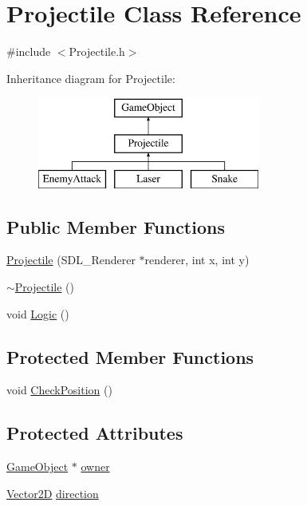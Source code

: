 \hypertarget{class_projectile}{}\section{Projectile Class Reference}
\label{class_projectile}


{\ttfamily \#include $<$Projectile.\+h$>$}

Inheritance diagram for Projectile\+:\begin{figure}[H]
\begin{center}
\leavevmode
\includegraphics[height=3.000000cm]{class_projectile}
\end{center}
\end{figure}
\subsection*{Public Member Functions}
\begin{DoxyCompactItemize}
\item 
\mbox{\hyperlink{class_projectile_a0906140caebe54c0b087c7e6240f3084}{Projectile}} (S\+D\+L\+\_\+\+Renderer $\ast$renderer, int x, int y)
\item 
\mbox{\hyperlink{class_projectile_a94903e021fa2edab60ba3836ca0b937d}{$\sim$\+Projectile}} ()
\item 
void \mbox{\hyperlink{class_projectile_a871e265207d2bf2d5180152a7acf2d40}{Logic}} ()
\end{DoxyCompactItemize}
\subsection*{Protected Member Functions}
\begin{DoxyCompactItemize}
\item 
void \mbox{\hyperlink{class_projectile_a6baf0fc9681b7c13b64a1c82671e296f}{Check\+Position}} ()
\end{DoxyCompactItemize}
\subsection*{Protected Attributes}
\begin{DoxyCompactItemize}
\item 
\mbox{\hyperlink{class_game_object}{Game\+Object}} $\ast$ \mbox{\hyperlink{class_projectile_a1a76b3677c7be9a072e7097c34adc517}{owner}}
\item 
\mbox{\hyperlink{struct_game_object_1_1_vector2_d}{Vector2D}} \mbox{\hyperlink{class_projectile_a0e4b335bd16e41ec9f8b2f6b8006cac8}{direction}}
\end{DoxyCompactItemize}
